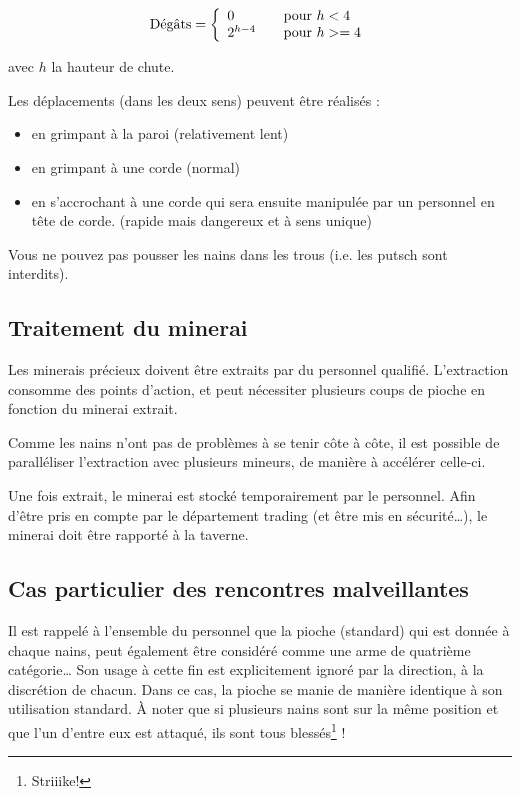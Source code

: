   \[
    \text{Dégâts} = 
    \left\{
      \begin{array}{l l}
        0         & \quad \text{pour $h < 4$}  \\
        2^{h-4} & \quad \text{pour $h >= 4$} \\
      \end{array}
    \right.
  \]

  avec $h$ la hauteur de chute.

  Les déplacements (dans les deux sens) peuvent être réalisés :

  \begin{itemize}
    \item en grimpant à la paroi (relativement lent)
    \item en grimpant à une corde (normal)
    \item en s'accrochant à une corde qui sera ensuite manipulée par un
      personnel en tête de corde. (rapide mais dangereux et à sens unique)
  \end{itemize}

  Vous ne pouvez pas pousser les nains dans les trous (i.e. les putsch sont
  interdits).

\subsection{Traitement du minerai}

  Les minerais précieux doivent être extraits par du personnel qualifié.
  L'extraction consomme des points d'action, et peut nécessiter plusieurs coups
  de pioche en fonction du minerai extrait.

  Comme les nains n'ont pas de problèmes à se tenir côte à côte, il est
  possible de paralléliser l'extraction avec plusieurs mineurs, de manière à
  accélérer celle-ci.

  Une fois extrait, le minerai est stocké temporairement par le personnel. Afin
  d'être pris en compte par le département trading (et être mis en
  sécurité\ldots{}), le minerai doit être rapporté à la taverne.

\subsection{Cas particulier des rencontres malveillantes}

  Il est rappelé à l'ensemble du personnel que la pioche (standard) qui est
  donnée à chaque nains, peut également être considéré comme une arme de
  quatrième catégorie\ldots{} Son usage à cette fin est explicitement ignoré par
  la direction, à la discrétion de chacun. Dans ce cas, la pioche se manie de
  manière identique à son utilisation standard. À noter que si plusieurs nains
  sont sur la même position et que l'un d'entre eux est attaqué, ils sont tous
  blessés\footnote{Striiike!} !

